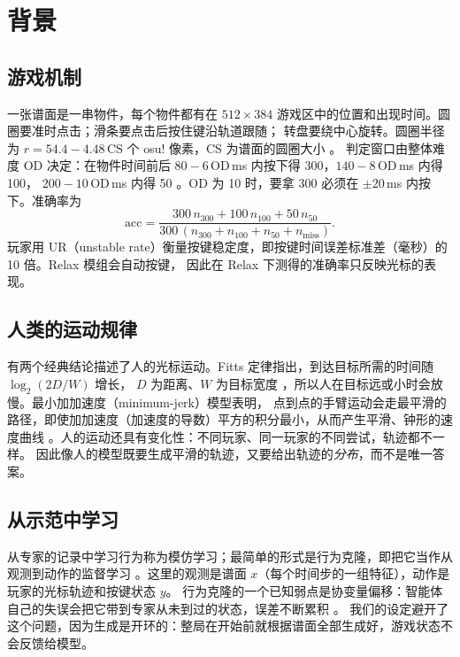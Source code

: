 \documentclass[11pt,a4paper,fontset=windows]{ctexart}
\begin{document}
\section{背景}
\subsection{游戏机制}
一张谱面是一串物件，每个物件都有在 $512\times384$ 游戏区中的位置和出现时间。圆圈要准时点击；滑条要点击后按住键沿轨道跟随；
转盘要绕中心旋转。圆圈半径为 $r = 54.4-4.48\,\mathrm{CS}$ 个 osu! 像素，CS 为谱面的圆圈大小 \citep{wikics}。
判定窗口由整体难度 OD 决定：在物件时间前后 $80-6\,\mathrm{OD}$\,ms 内按下得 300，$140-8\,\mathrm{OD}$\,ms 内得 100，
$200-10\,\mathrm{OD}$\,ms 内得 50 \citep{wikiod}。OD 为 10 时，要拿 300 必须在 $\pm20$\,ms 内按下。准确率为
\begin{equation}
  \mathrm{acc}=\frac{300\,n_{300}+100\,n_{100}+50\,n_{50}}{300\,(n_{300}+n_{100}+n_{50}+n_{\mathrm{miss}})}.
  \label{eq:acc}
\end{equation}
玩家用 UR（unstable rate）衡量按键稳定度，即按键时间误差标准差（毫秒）的 10 倍。Relax 模组会自动按键，
因此在 Relax 下测得的准确率只反映光标的表现。

\subsection{人类的运动规律}
有两个经典结论描述了人的光标运动。Fitts 定律指出，到达目标所需的时间随 $\log_2(2D/W)$ 增长，
$D$ 为距离、$W$ 为目标宽度 \citep{fitts1954}，所以人在目标远或小时会放慢。最小加加速度（minimum-jerk）模型表明，
点到点的手臂运动会走最平滑的路径，即使加加速度（加速度的导数）平方的积分最小，从而产生平滑、钟形的速度曲线
\citep{flash1985}。人的运动还具有变化性：不同玩家、同一玩家的不同尝试，轨迹都不一样。
因此像人的模型既要生成平滑的轨迹，又要给出轨迹的\emph{分布}，而不是唯一答案。

\subsection{从示范中学习}
从专家的记录中学习行为称为模仿学习；最简单的形式是行为克隆，即把它当作从观测到动作的监督学习
\citep{pomerleau1989, hussein2017}。这里的观测是谱面 $x$（每个时间步的一组特征），动作是玩家的光标轨迹和按键状态 $y$。
行为克隆的一个已知弱点是协变量偏移：智能体自己的失误会把它带到专家从未到过的状态，误差不断累积 \citep{ross2011}。
我们的设定避开了这个问题，因为生成是开环的：整局在开始前就根据谱面全部生成好，游戏状态不会反馈给模型。
\end{document}
